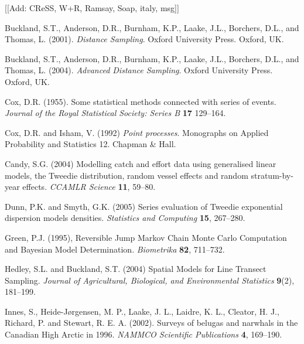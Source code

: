 \documentclass[useAMS,referee]{biom}
\begin{document}

[[Add: CReSS, W+R, Ramsay, Soap, italy, msg]]

\begin{thebibliography}{}
\bibitem{ } Buckland, S.T., Anderson, D.R., Burnham, K.P., Laake, J.L., Borchers, D.L., and Thomas, L.  (2001). \textit{Distance Sampling}. Oxford University Press. Oxford, UK.

\bibitem{ } Buckland, S.T., Anderson, D.R., Burnham, K.P., Laake, J.L., Borchers, D.L., and Thomas, L.  (2004). \textit{Advanced Distance Sampling}. Oxford University Press. Oxford, UK.

\bibitem{ } Cox, D.R. (1955). Some statistical methods connected with series of events. \textit{Journal of the Royal Statistical Society: Series B} \textbf{17} 129--164.

\bibitem{ } Cox, D.R. and Isham, V. (1992) \textit{Point processes}. Monographs on Applied Probability and Statistics 12. Chapman \& Hall.

\bibitem{ } Candy, S.G. (2004) Modelling catch and effort data using generalised linear models, the Tweedie distribution, random vessel effects and random stratum-by-year effects. \textit{CCAMLR Science} \textbf{11}, 59--80.

\bibitem{ } Dunn, P.K. and Smyth, G.K. (2005) Series evaluation of Tweedie exponential dispersion models densities. \textit{Statistics and Computing} \textbf{15}, 267--280.

\bibitem{} Green, P.J. (1995), Reversible Jump {M}arkov Chain {M}onte {C}arlo Computation and {B}ayesian Model Determination. \textit{Biometrika} \textbf{82}, 711--732.

\bibitem{ } Hedley, S.L. and Buckland, S.T. (2004) Spatial Models for Line Transect Sampling. \textit{Journal of Agricultural, Biological, and Environmental Statistics} \textbf{9}(2), 181--199.

\bibitem{ } Innes, S., Heide-J\o rgensen, M. P., Laake, J. L., Laidre, K. L., Cleator, H. J., Richard, P. and Stewart, R. E. A. (2002). Surveys of belugas and narwhals in the {C}anadian {H}igh {A}rctic in 1996. \textit{NAMMCO Scientific Publications} \textbf{4}, 169--190.


\end{thebibliography}
\end{document}

